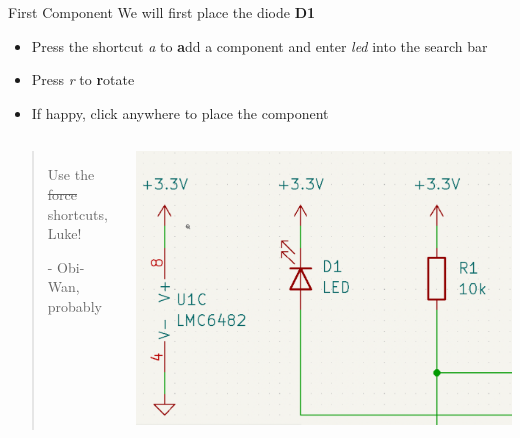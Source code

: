 \documentclass{beamer}
\begin{document}
\begin{frame}{First Component}
  We will first place the diode \textbf{D1}
  \begin{itemize}
    \item Press the shortcut \textit{a} to \textbf{a}dd a component and enter \textit{led} into the search bar
    \item Press \textit{r} to \textbf{r}otate
    \item If happy, click anywhere to place the component
  \end{itemize}

  \vfill
  \begin{columns}
    \begin{quote}
      Use the \sout{force} shortcuts, Luke!

    {\normalfont \scriptsize - Obi-Wan, probably}
    \end{quote}
    \includegraphics[width=\textwidth]{images/first-steps.png}
  \end{columns}
\end{frame}
\end{document}
